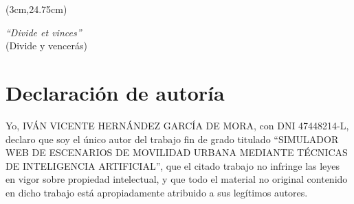 \begin{textblock*}{\textwidth}(3cm,24.75cm) 
\begin{flushright}
{\fontsize{14pt}{4pt}\selectfont \fecha}
\end{flushright}
\end{textblock*}


\cleardoublepage
\thispagestyle{empty}

\vspace*{9cm}
\begin{flushright}
{\em ``Divide et vinces''}\\[0.4em]
{\footnotesize (Divide y vencerás)}
\end{flushright}



\cleardoublepage
\thispagestyle{plain}
\chapter*{Declaración de autoría}



Yo, IVÁN VICENTE HERNÁNDEZ GARCÍA DE MORA, con DNI 47448214-L, declaro que soy el único autor del trabajo fin de grado titulado ``SIMULADOR WEB DE ESCENARIOS DE MOVILIDAD URBANA MEDIANTE TÉCNICAS DE INTELIGENCIA ARTIFICIAL'', que el citado trabajo no infringe las leyes en vigor sobre propiedad intelectual, y que todo el material no original contenido en dicho trabajo está apropiadamente atribuido a sus legítimos autores.

